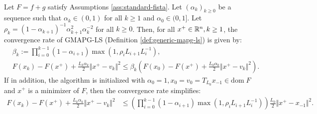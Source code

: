 \documentclass[12pt]{report}
\begin{document}
        \begin{theorem}\; \label{thm:gmapg-ls-convergence}\;\\
            Let $F = f + g$ satisfy Assumptions \ref{ass:standard-fista}. 
            Let $(\alpha_k)_{k \ge 0}$ be a sequence such that $\alpha_k \in (0, 1)$ for all $k \ge 1$ and $\alpha_0 \in (0, 1]$. 
            Let $\rho_k = (1 - \alpha_{k + 1})^{-1}\alpha_{k + 1}^2 \alpha_k^{-2}$ for all $k \ge 0$. 
            Then, for all $x^+ \in \mathbb R^n, k \ge 1$, the convergence rate of GMAPG-LS (Definition \ref{def:generic-mapg-ls}) is given by: 
            \begin{align*}
                & \beta_k := \prod_{i = 0}^{k - 1} (1 - \alpha_{i + 1})
                \max\left(1, \rho_i L_{i + 1}L_i^{-1}\right), 
                \\
                & F(x_k) - F(x^+) + \frac{L_k\alpha_k}{2}\Vert x^+ - v_k\Vert^2
                \le 
                \beta_k
                \left(
                    F(x_0) - F(x^+) + \frac{L_0\alpha_0}{2} \Vert x^+ - v_k\Vert^2
                \right). 
            \end{align*}
            If in addition, the algorithm is initialized with $\alpha_0 = 1, x_0 = v_0 = T_{L_{0}}x_{-1} \in \text{dom}\; F$ and $x^+$ is a minimizer of $F$, then the convergence rate simplifies: 
            \begin{align*}
                F(x_k) - F(x^+) + \frac{L_k\alpha_k}{2}\Vert x^+ - v_k\Vert^2
                & \le 
                \left(
                    \prod_{i = 0}^{k - 1} (1 - \alpha_{i + 1})
                    \max\left(1, \rho_i L_{i + 1}L_i^{-1}\right)
                \right)
                \frac{L_0}{2}\Vert x^+ - x_{-1}\Vert^2. 
            \end{align*}
        \end{theorem}
\end{document}
